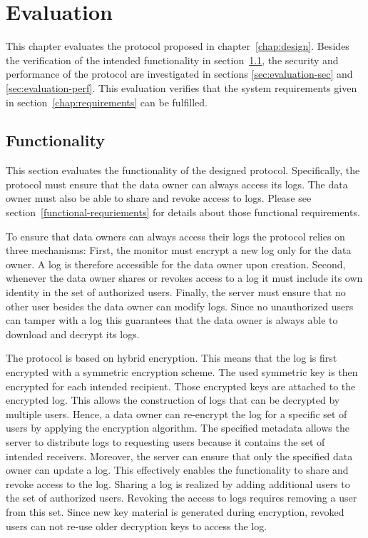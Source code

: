 \documentclass[../main.tex]{subfiles}
\begin{document}
\chapter{Evaluation}

This chapter evaluates the protocol proposed in chapter~\ref{chap:design}.
Besides the verification of the intended functionality in section~\ref{sec:evaluation-func}, the security and performance of the protocol are investigated in sections \ref{sec:evaluation-sec} and \ref{sec:evaluation-perf}.
This evaluation verifies that the system requirements given in section~\ref{chap:requirements} can be fulfilled.

\section{Functionality}
\label{sec:evaluation-func}

This section evaluates the functionality of the designed protocol.
Specifically, the protocol must ensure that the data owner can always access its logs.
The data owner must also be able to share and revoke access to logs.
Please see section~\ref{functional-requriements} for details about those functional requirements.

To ensure that data owners can always access their logs the protocol relies on three mechanisms:
First, the monitor must encrypt a new log only for the data owner.
A log is therefore accessible for the data owner upon creation.
Second, whenever the data owner shares or revokes access to a log it must include its own identity in the set of authorized users.
Finally, the server must ensure that no other user besides the data owner can modify logs.
Since no unauthorized users can tamper with a log this guarantees that the data owner is always able to download and decrypt its logs.

The protocol is based on hybrid encryption.
This means that the log is first encrypted with a symmetric encryption scheme.
The used symmetric key is then encrypted for each intended recipient.
Those encrypted keys are attached to the encrypted log.
This allows the construction of logs that can be decrypted by multiple users.
Hence, a data owner can re-encrypt the log for a specific set of users by applying the encryption algorithm.
The specified metadata allows the server to distribute logs to requesting users because it contains the set of intended receivers.
Moreover, the server can ensure that only the specified data owner can update a log.
This effectively enables the functionality to share and revoke access to the log.
Sharing a log is realized by adding additional users to the set of authorized users.
Revoking the access to logs requires removing a user from this set.
Since new key material is generated during encryption, revoked users can not re-use older decryption keys to access the log.
\end{document}
